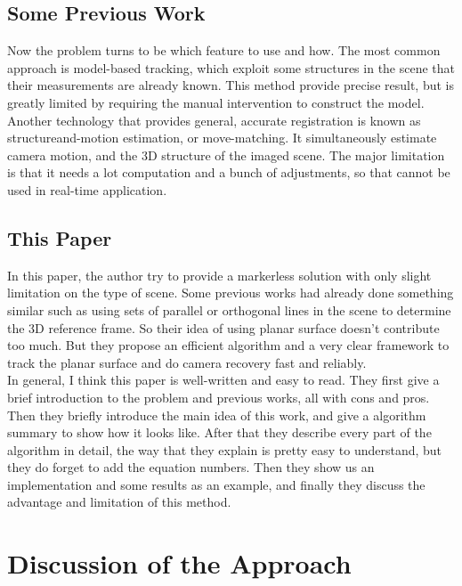 \documentclass[10pt,twocolumn,letterpaper]{article}
\begin{document}
\subsection{Some Previous Work}
Now the problem turns to be which feature to use and how. 
The most common approach is model-based tracking, which 
exploit some structures in the scene 
that their measurements are already known. This method provide 
precise result, but is greatly limited by requiring the manual 
intervention to construct the model.\\

Another technology that provides general, accurate registration
 is known as structureand-motion estimation, or move-matching. 
It simultaneously estimate camera motion, and
the 3D structure of the imaged scene. 
The major limitation is that it needs a lot computation 
and a bunch of adjustments, 
so that cannot be used in real-time application.

\subsection{This Paper}
In this paper, the author try to provide a markerless solution with only slight
limitation on the type of scene. Some previous works had already done 
something similar such as using sets of parallel or orthogonal lines 
in the scene to determine the 3D reference frame. So their idea of 
using planar surface doesn't contribute too much. But they propose 
an efficient algorithm and a very clear framework to
track the planar surface and do camera recovery fast and reliably.\\

In general, I think this paper is well-written and easy
 to read. They first give a brief introduction to the problem 
and previous works, all with cons and pros. Then they briefly 
introduce the main idea of this work, and give a algorithm summary 
to show how it looks like. After that they describe every part 
of the algorithm in detail, the way that they explain is pretty easy 
to understand, but they do forget to add the equation numbers. Then they 
show us an implementation and some results as an example, and finally 
they discuss the advantage and limitation of this method.


\section{Discussion of the Approach}
\end{document}
